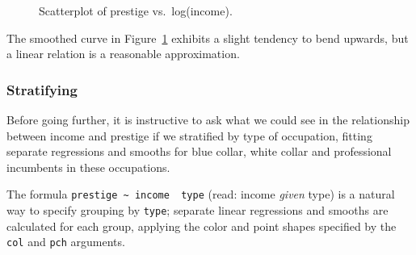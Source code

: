 \documentclass[
  letterpaper,
  10pt,
  krantz2]{krantz}
\begin{document}
\begin{figure}


\caption{\label{fig-Prestige-scatterplot2}Scatterplot of prestige
vs.~log(income).}

\end{figure}%

The smoothed curve in Figure~\ref{fig-Prestige-scatterplot2} exhibits a
slight tendency to bend upwards, but a linear relation is a reasonable
approximation.

\subsubsection{Stratifying}\label{sec-stratifying}

Before going further, it is instructive to ask what we could see in the
relationship between income and prestige if we stratified by type of
occupation, fitting separate regressions and smooths for blue collar,
white collar and professional incumbents in these occupations.

The formula
\texttt{prestige\ \textasciitilde{}\ income\ \textbar{}\ type} (read:
income \emph{given} type) is a natural way to specify grouping by
\texttt{type}; separate linear regressions and smooths are calculated
for each group, applying the color and point shapes specified by the
\texttt{col} and \texttt{pch} arguments.
\end{document}
